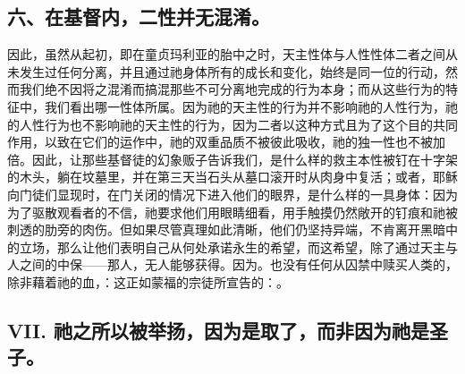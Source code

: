 
\subsection{六、在基督内，二性并无混淆。}

因此，虽然从起初，即在童贞玛利亚的胎中之时，天主性体与人性性体二者之间从未发生过任何分离，并且通过祂身体所有的成长和变化，始终是同一位的行动，然而我们绝不因将之混淆而搞混那些不可分离地完成的行为本身；而从这些行为的特征中，我们看出哪一性体所属。因为祂的天主性的行为并不影响祂的人性行为，祂的人性行为也不影响祂的天主性的行为，因为二者以这种方式且为了这个目的共同作用，以致在它们的运作中，祂的双重品质不被彼此吸收，祂的独一性也不被加倍。因此，让那些基督徒的幻象贩子告诉我们，是什么样的救主本性被钉在十字架的木头，躺在坟墓里，并在第三天当石头从墓口滚开时从肉身中复活；或者，耶稣向门徒们显现时，在门关闭的情况下进入他们的眼界，是什么样的一具身体：因为为了驱散观看者的不信，祂要求他们用眼睛细看，用手触摸仍然敞开的钉痕和祂被刺透的肋旁的肉伤。但如果尽管真理如此清晰，他们仍坚持异端，不肯离开黑暗中的立场，那么让他们表明自己从何处承诺永生的希望，而这希望，除了通过天主与人之间的中保——那人，无人能够获得。因为。也没有任何从囚禁中赎买人类的，除非藉着祂的血，：这正如蒙福的宗徒所宣告的：。\par


\subsection{VII. 祂之所以被举扬，因为是取了，而非因为祂是圣子。}

